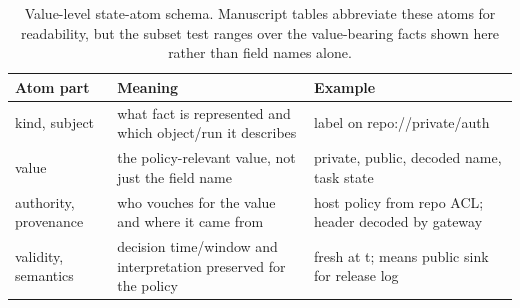 \begin{table}[t]
  \caption{Value-level state-atom schema. Manuscript tables abbreviate these
  atoms for readability, but the subset test ranges over the value-bearing
  facts shown here rather than field names alone.}
  \label{tab:state-atom-schema}
  \centering\footnotesize
  \begin{tabular}{@{}p{}p{}p{}@{}}
    \toprule
    Atom part & Meaning & Example \\
    \midrule
    kind, subject & what fact is represented and which object/run it describes & label on repo://private/auth \\
    value & the policy-relevant value, not just the field name & private, public, decoded name, task state \\
    authority, provenance & who vouches for the value and where it came from & host policy from repo ACL; header decoded by gateway \\
    validity, semantics & decision time/window and interpretation preserved for the policy & fresh at t; means public sink for release log \\
    \bottomrule
  \end{tabular}
\end{table}
